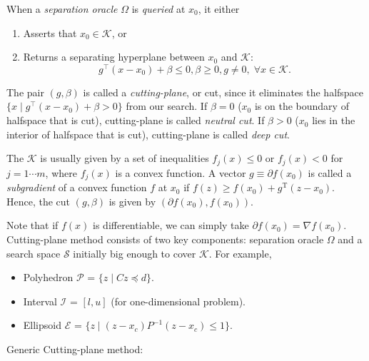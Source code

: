 \documentclass[final,leqno]{siamltex}
\providecommand{\tightlist}{%
  \setlength{\itemsep}{0pt}\setlength{\parskip}{0pt}}
\begin{document}
When a \emph{separation oracle} \(\Omega\) is \emph{queried} at \(x_0\), it either

\begin{enumerate}
\def\labelenumi{\arabic{enumi}.}
\tightlist
\item
  Asserts that \(x_0 \in \mathcal{K}\), or
\item
  Returns a separating hyperplane between \(x_0\) and \(\mathcal{K}\):
  \begin{equation}g^\top (x - x_0) + \beta \leq 0, \beta \geq 0, g \neq 0, \; \forall x \in \mathcal{K}.\label{eq:cut}\end{equation}
\end{enumerate}

The pair \((g, \beta)\) is called a \emph{cutting-plane}, or cut, since it eliminates the halfspace \(\{x \mid g^\top (x - x_0) + \beta > 0\}\) from our search. If \(\beta=0\) (\(x_0\) is on the boundary of halfspace that is cut), cutting-plane is called \emph{neutral cut}. If \(\beta>0\) (\(x_0\) lies in the interior of halfspace that is cut), cutting-plane is called \emph{deep cut}.

The \(\mathcal{K}\) is usually given by a set of inequalities \(f_j(x) \le 0\) or \(f_j(x) < 0\) for \(j = 1 \cdots m\), where \(f_j(x)\) is a convex function. A vector \(g \equiv \partial f(x_0)\) is called a \emph{subgradient} of a convex function \(f\) at \(x_0\) if \(f(z) \geq f(x_0) + g^\mathrm{T} (z - x_0)\). Hence, the cut \((g, \beta)\) is given by \((\partial f(x_0), f(x_0))\).

Note that if \(f(x)\) is differentiable, we can simply take \(\partial f(x_0) = \nabla f(x_0)\). Cutting-plane method consists of two key components: separation oracle \(\Omega\) and a search space \(\mathcal{S}\) initially big enough to cover \(\mathcal{K}\). For example,

\begin{itemize}
\tightlist
\item
  Polyhedron \(\mathcal{P}\) = \(\{z \mid C z \preceq d \}\).
\item
  Interval \(\mathcal{I}\) = \([l, u]\) (for one-dimensional problem).
\item
  Ellipsoid \(\mathcal{E}\) = \(\{z \mid (z-x_c)P^{-1}(z-x_c) \leq 1 \}\).
\end{itemize}

Generic Cutting-plane method:
\end{document}
